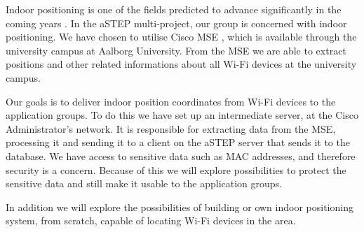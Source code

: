 Indoor positioning is one of the fields predicted to advance significantly in the coming years \cite{DonDIndoorIsNext}. In the aSTEP multi-project, our group is concerned with indoor positioning. We have chosen to utilise Cisco MSE \cite{ciscoMSE}, which is available through the university campus at Aalborg University. From the MSE we are able to extract positions and other related informations about all Wi-Fi devices at the university campus.

Our goals is to deliver indoor position coordinates from Wi-Fi devices to the application groups. To do this we have set up an intermediate server, at the Cisco Administrator's network. It is responsible for extracting data from the MSE, processing it and sending it to a client on the aSTEP server that sends it to the database. We have access to sensitive data such as MAC addresses, and therefore security is a concern. Because of this we will explore possibilities to protect the sensitive data and still make it usable to the application groups.

In addition we will explore the possibilities of building or own indoor positioning system, from scratch, capable of locating Wi-Fi devices in the area.